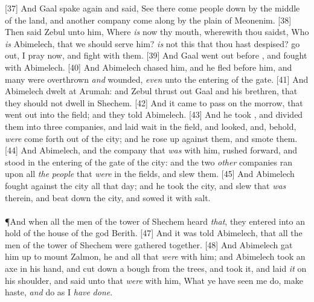 [37] \textcolor[cmyk]{0.99998,1,0,0}{And Gaal spake again and said, See there come people down by the middle of the land, and another company come along by the plain of Meonenim.}
[38] \textcolor[cmyk]{0.99998,1,0,0}{Then said Zebul unto him, Where \emph{is} now thy mouth, wherewith thou saidst, Who \emph{is} Abimelech, that we should serve him? \emph{is} not this  that thou hast despised? go out, I pray now, and fight with them.}
[39] \textcolor[cmyk]{0.99998,1,0,0}{And Gaal went out before , and fought with Abimelech.}
[40] \textcolor[cmyk]{0.99998,1,0,0}{And Abimelech chased him, and he fled before him, and many were overthrown \emph{and} wounded, \emph{even} unto the entering of the gate.}
[41] \textcolor[cmyk]{0.99998,1,0,0}{And Abimelech dwelt at Arumah: and Zebul thrust out Gaal and his brethren, that they should not dwell in Shechem.}
[42] \textcolor[cmyk]{0.99998,1,0,0}{And it came to pass on the morrow, that  went out into the field; and they told Abimelech.}
[43] \textcolor[cmyk]{0.99998,1,0,0}{And he took , and divided them into three companies, and laid wait in the field, and looked, and, behold,  \emph{were} come forth out of the city; and he rose up against them, and smote them.}
[44] \textcolor[cmyk]{0.99998,1,0,0}{And Abimelech, and the company that \emph{was} with him, rushed forward, and stood in the entering of the gate of the city: and the two \emph{other} companies ran upon all \emph{the} \emph{people} that \emph{were} in the fields, and slew them.}
[45] \textcolor[cmyk]{0.99998,1,0,0}{And Abimelech fought against the city all that day; and he took the city, and slew  that \emph{was} therein, and beat down the city, and sowed it with salt.}\\
\\
\P \textcolor[cmyk]{0.99998,1,0,0}{And when all the men of the tower of Shechem heard \emph{that}, they entered into an hold of the house of the god Berith.}
[47] \textcolor[cmyk]{0.99998,1,0,0}{And it was told Abimelech, that all the men of the tower of Shechem were gathered together.}
[48] \textcolor[cmyk]{0.99998,1,0,0}{And Abimelech gat him up to mount Zalmon, he and all  that \emph{were} with him; and Abimelech took an axe in his hand, and cut down a bough from the trees, and took it, and laid \emph{it} on his shoulder, and said unto  that \emph{were} with him, What ye have seen me do, make haste, \emph{and} do as I \emph{have} \emph{done}.}
